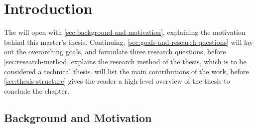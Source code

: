 \chapter{Introduction}
\label{cha:introduction}

\begin{comment}
All chapters should begin with an introduction before any sections, giving an overview of the chapter content.
Each section should in addition start with an introduction before its subsections begin.
Chapters with just one section --- or sections with just one sub-section --- should be avoided.
Think carefully about chapter and section titles as each title stands alone in the table of contents (without associated text)
and should convey the meaning of the contents of the chapter or section.

In all chapters and sections it is important to write clearly and concisely. Avoid repetitions and if needed refer back to the original discussion or presentation.
Each new section, subsection or paragraph should provide the reader with new information and be written in your own words. Avoid direct quotes.
If you use direct quotes, unless the quote itself is very significant, you are conveying to the reader that you are unable to express this discussion or fact yourself.
Such direct quotes also break the flow of the language (yours to someone else's).
\end{comment}

The  will open with \autoref{sec:background-and-motivation}, explaining the motivation behind this master's thesis. Continuing, \autoref{sec:goals-and-research-questions} will lay out the overarching goals, and formulate three research questions, before \autoref{sec:research-method} explains the research method of the thesis, which is to be considered a technical thesis.  will list the main contributions of the work, before \autoref{sec:thesis-structure} gives the reader a high-level overview of the thesis to conclude the  chapter.

\section{Background and Motivation}
\label{sec:background-and-motivation}

